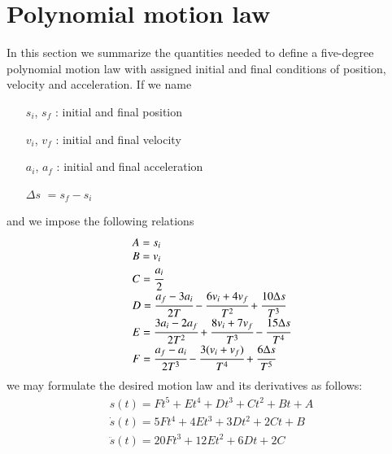 \documentclass[preprint, 12pt]{elsarticle}
\begin{document}
\section{Polynomial motion law}
\label{app:poly5}
In this section we summarize the quantities needed to define a five-degree polynomial motion law with assigned initial and final conditions of position, velocity and acceleration. If we name
\begin{itemize}
    \item[$s_i$, $s_f$]: initial and final position
    \item[$v_i$, $v_f$]: initial and final velocity
    \item[$a_i$, $a_f$]: initial and final acceleration
    \item[$\Delta s$]$= s_f - s_i$
\end{itemize}
and we impose the following relations
\begin{equation}
    \begin{array}{l}
        A = s_i\\
        B = v_i\\
        C = \cfrac{a_i}{2}\\
        D = \cfrac{a_f - 3a_i}{2T} - \cfrac{6v_i + 4v_f}{T^2} + \cfrac{10 \Delta s}{T^3}\\
        E = \cfrac{3a_i - 2a_f}{2T^2} + \cfrac{8v_i + 7v_f}{T^3} - \cfrac{15 \Delta s}{T^4}\\
        F = \cfrac{a_f - a_i}{2T^3} - \cfrac{3(v_i + v_f)}{T^4} + \cfrac{6 \Delta s}{T^5}\\
    \end{array}
\end{equation}
we may formulate the desired motion law and its derivatives as follows:
\begin{equation}
    \begin{array}{l}
        s(t) = Ft^5 + Et^4 + Dt^3 + Ct^2 + Bt + A\\
        \dot{s}(t) = 5Ft^4 + 4Et^3 + 3Dt^2 + 2Ct + B\\
        \ddot{s}(t) = 20Ft^3 + 12Et^2 + 6Dt + 2C\\
    \end{array}
    \label{eq:poly5}
\end{equation}


% 
% 

\end{document}
